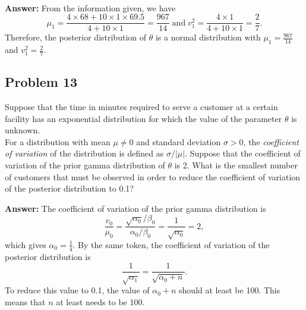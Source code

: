 \documentclass{article}
\begin{document}
\

\textbf{Answer:} From the information given, we have 
\begin{equation*}
\mu_1 = \frac{4 \times 68 + 10 \times 1 \times 69.5}{4 + 10 \times 1} = \frac{967}{14} \; \text{and} \;
v_1^2 = \frac{4 \times 1}{4 + 10 \times 1} = \frac{2}{7}.
\end{equation*}
Therefore, the posterior distribution of $\theta$ is a normal distribution with $\mu_1 = \frac{967}{14}$ and $v_1^2 = \frac{2}{7}$.

\bigskip

\subsection*{Problem 13}
Suppose that the time in minutes required to serve a customer at a certain facility has an exponential distribution for which the value of the parameter $\theta$ is unknown.\\
For a distribution with mean $\mu \ne 0$ and standard deviation $\sigma > 0$, the \textit{coefficient of variation} of the distribution is defined as $\sigma/|\mu|$. Suppose that the coefficient of variation of the prior gamma distribution of $\theta$ is 2. What is the smallest number of customers that must be observed in order to reduce the coefficient of variation of the posterior distribution to 0.1?

\textbf{Answer:} The coefficient of variation of the prior gamma distribution is
\begin{equation*}
\frac{v_0}{\mu_0} = \frac{\sqrt{\alpha_0}/\beta_0}{\alpha_0/\beta_0} = \frac{1}{\sqrt{\alpha_0}} = 2,
\end{equation*}
which gives $\alpha_0 = \frac{1}{4}$. By the same token, the coefficient of variation of the posterior distribution is 
\begin{equation*}
\frac{1}{\sqrt{\alpha_1}} = \frac{1}{\sqrt{\alpha_0 + n}}.
\end{equation*}
To reduce this value to 0.1, the value of $\alpha_0 + n$ should at least be 100. This means that $n$ at least needs to be 100.

\newpage
\end{document}
